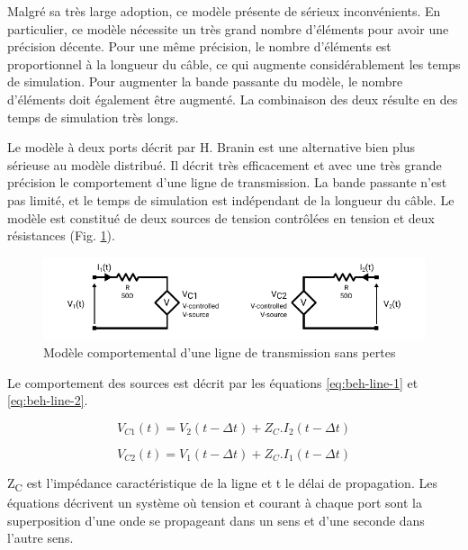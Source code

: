 Malgré sa très large adoption, ce modèle présente de sérieux inconvénients.
En particulier, ce modèle nécessite un très grand nombre d'éléments pour avoir une précision décente.
Pour une même précision, le nombre d'éléments est proportionnel à la longueur du câble, ce qui augmente considérablement les temps de simulation.
Pour augmenter la bande passante du modèle, le nombre d'éléments doit également être augmenté.
La combinaison des deux résulte en des temps de simulation très longs.

Le modèle à deux ports décrit par H. Branin \cite{branin-tl-ref} est une alternative bien plus sérieuse au modèle distribué.
Il décrit très efficacement et avec une très grande précision le comportement d'une ligne de transmission.
La bande passante n'est pas limité, et le temps de simulation est indépendant de la longueur du câble.
Le modèle est constitué de deux sources de tension contrôlées en tension et deux résistances (Fig. \ref{fig:beh-line-model}).

\begin{figure}[!h]
  \centering
  \includegraphics[width=\textwidth]{src/1/figures/behavioral_line_model.pdf}
  \caption{Modèle comportemental d'une ligne de transmission sans pertes}
  \label{fig:beh-line-model}
\end{figure}

Le comportement des sources est décrit par les équations \ref{eq:beh-line-1} et \ref{eq:beh-line-2}.

\begin{equation}
V_{C1}(t) = V_{2}(t - \Delta t) + Z_{C}.I_{2}(t - \Delta t)
\label{eq:beh-line-1}
\end{equation}

\begin{equation}
V_{C2}(t) = V_{1}(t - \Delta t) + Z_{C}.I_{1}(t - \Delta t)
\label{eq:beh-line-2}
\end{equation}

Z\textsubscript{C} est l'impédance caractéristique de la ligne et \textDelta{}t le délai de propagation.
Les équations décrivent un système où tension et courant à chaque port sont la superposition d'une onde se propageant dans un sens et d'une seconde dans l'autre sens.

